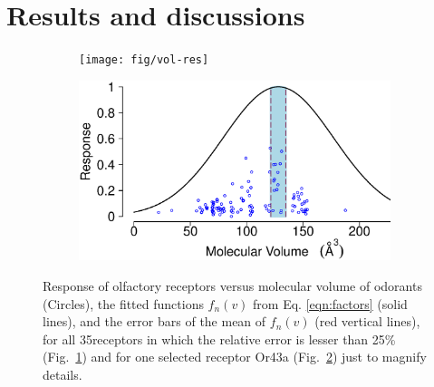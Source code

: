 \documentclass[11pt]{paper} %
\newcommand{\numberofreceptors}{35}
\begin{document}
\section{Results and discussions}
\begin{figure}
	\centering
	\begin{subfigure}[b]{\textwidth}
		\texttt{[image: fig/vol-res]}
		\caption{}
		\label{fig:vol-res:all}		
	\end{subfigure}
	\begin{subfigure}[b]{0.75 \textwidth}
		\includegraphics[width= \textwidth]{fig/vol-res-Or43a}
		\caption{}	
		\label{fig:vol-res:one}	
	\end{subfigure}
	\caption{Response of olfactory receptors  versus molecular volume of odorants (Circles), the fitted functions $f_n(v)$ from Eq. 			\ref{eqn:factors} (solid lines), 
		and the error bars of the mean of $f_n(v)$ (red vertical lines),
		for all \numberofreceptors receptors in which the relative error is lesser than 25\% (Fig.~\ref{fig:vol-res:all}) and for one selected receptor Or43a (Fig.~\ref{fig:vol-res:one}) just to magnify details. }
	\label{fig:vol-res}
\end{figure}
\end{document}
